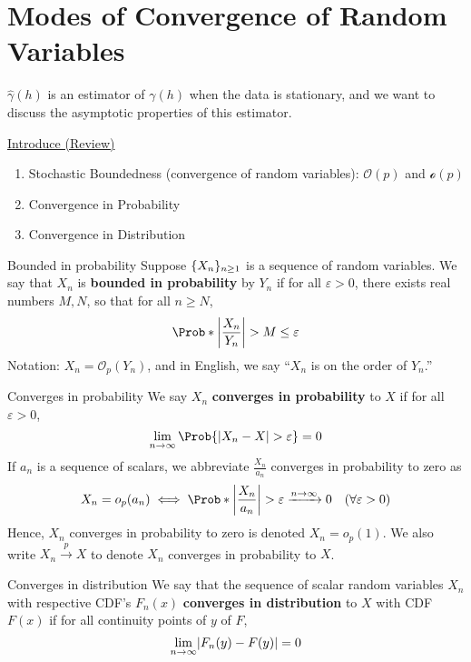 \section{Modes of Convergence of Random Variables}
$ \hat{\gamma}(h) $ is an estimator of $ \gamma(h) $ when the data is stationary,
and we want to discuss the asymptotic properties of this estimator.

\underline{Introduce (Review)}
\begin{enumerate}
    \item Stochastic Boundedness (convergence of random variables): $ \mathcal{O}(p) $
          and $ \mathcal{o}(p) $
    \item Convergence in Probability
    \item Convergence in Distribution
\end{enumerate}
\begin{Definition}{Bounded in probability}{}
    Suppose $ \{X_n\}_{n\ge 1} $ is a sequence of random variables.
    We say that $ X_n $ is \textbf{bounded in probability}
    by $ Y_n $ if for all $ \varepsilon>0 $, there exists real numbers
    $ M,N $, so that for all $ n\ge N $,
    \[ \Prob*{\abs*{\frac{X_n}{Y_n}}> M}\le \varepsilon
    \]
    Notation: $ X_n=\mathcal{O}_p(Y_n) $, and in English, we say
    ``$ X_n $ is on the order of $ Y_n $.''
\end{Definition}
\begin{Definition}{Converges in probability}{}
    We say $ X_n $ \textbf{converges in probability}
    to $ X $ if for all $ \varepsilon>0 $,
    \[ \lim\limits_{{n} \to {\infty}} \Prob{\abs{X_n-X}>\varepsilon}=0 \]
    If $ a_n $ is a sequence of scalars, we abbreviate
    $ \displaystyle \frac{X_n}{a_n} $
    converges in probability to zero as
    \[ X_n=o_p(a_n)\iff \Prob*{\abs*{\frac{X_n}{a_n}}>\varepsilon}\xrightarrow{n\to\infty}0
        \quad (\forall\varepsilon>0) \]
    Hence, $ X_n $
    converges in probability to zero is denoted $ X_n=o_p(1) $.
    We also write $ X_n\stackrel{p}{\to}X $ to denote $ X_n $
    converges in probability to $ X $.
\end{Definition}
\begin{Definition}{Converges in distribution}{}
    We say that the sequence of scalar random variables
    $ X_n $ with respective CDF's $ F_n(x) $
    \textbf{converges in distribution} to $ X $ with CDF $ F(x) $
    if for all continuity points of $ y $ of $ F $,
    \[ \lim\limits_{{n} \to {\infty}} \lvert F_n(y)-F(y)\rvert=0 \]
\end{Definition}
